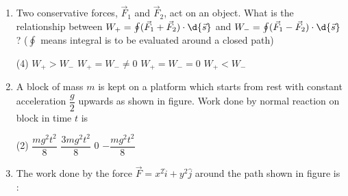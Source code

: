 \documentclass{article}
\renewcommand{\ans}{\quad}
\begin{document}
\begin{enumerate}
    \item Two conservative forces, $\vec{F}_1$ and $\vec{F}_2$, act on an object. What is the relationship between $W_+=\oint(\vec{F}_1 + \vec{F}_2)\cdot \d{\vec{s}}$ and $W_-=\oint(\vec{F}_1 - \vec{F}_2)\cdot\d{\vec{s}}$ ? ($\oint$ means integral is to be evaluated around a closed path)
        \begin{tasks}(4)
            \task $W_+>W_-$
            \task $W_+=W_-\neq0$
            \task $W_+=W_-=0$\ans
            \task $W_+<W_-$
        \end{tasks}
        
    \item A block of mass $m$ is kept on a platform which starts from rest with constant acceleration $\dfrac{g}{2}$ upwards as shown in figure. Work done by normal reaction on block in time $t$ is
        \begin{center}
        \end{center}
        \begin{tasks}(2)
            \task $\dfrac{mg^2t^2}{8}$
            \task $\dfrac{3mg^2t^2}{8}$\ans
            \task $0$
            \task $-\dfrac{mg^2t^2}{8}$
        \end{tasks}
        
    \item The work done by the force $\vec{F}=x^2\hat{i} + y^2\hat{j}$ around the path shown in figure is :
        
        \begin{center}
        \end{center}
        

\end{enumerate}
\end{document}
